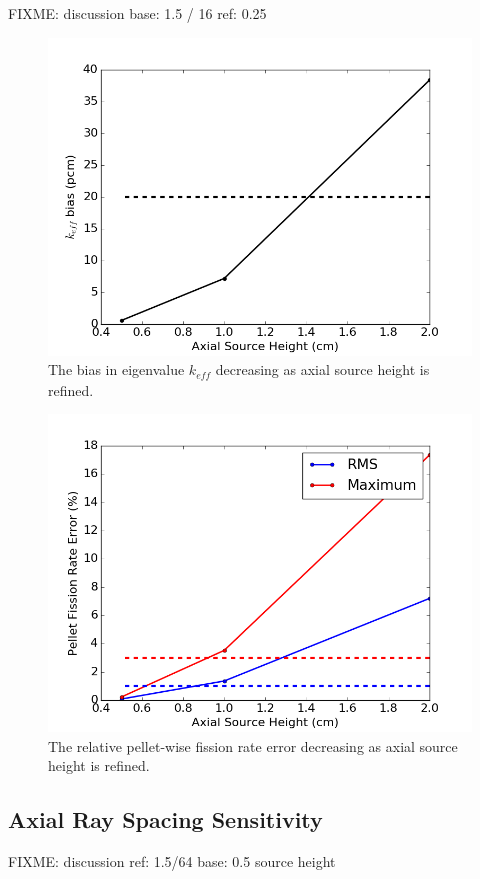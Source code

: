 FIXME: discussion
base: 1.5 / 16
ref: 0.25

\begin{figure}[h!]
	\centering
	\includegraphics[width=0.7\linewidth]{figures/results/sensitivity/rodded_source_height_pcm.png}
	\caption[]{The bias in eigenvalue $k_{\textit{eff}}$ decreasing as axial source height is refined.}
	\label{fig:rodded-axial-sh-pcm}
\end{figure}
\begin{figure}[h!]
	\centering
	\includegraphics[width=0.7\linewidth]{figures/results/sensitivity/rodded_source_height_fr.png}
	\caption[]{The relative pellet-wise fission rate error decreasing as axial source height is refined.}
	\label{fig:rodded-axial-sh-fr}
\end{figure}

\subsection{Axial Ray Spacing Sensitivity}

FIXME: discussion
ref: 1.5/64
base: 0.5 source height

